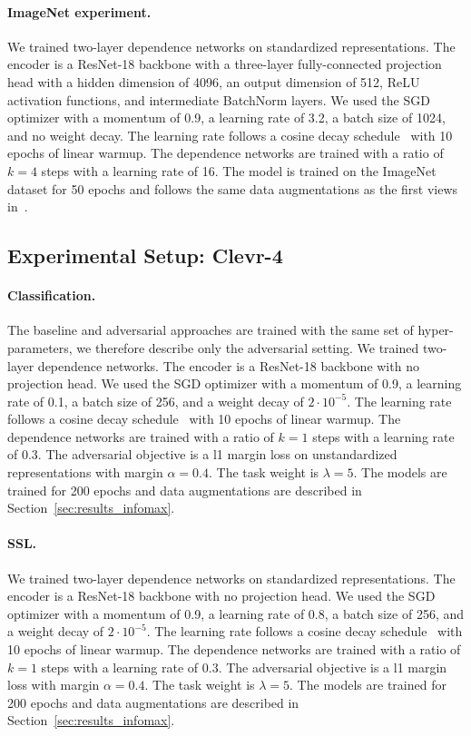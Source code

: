 \paragraph{ImageNet experiment.} We trained two-layer dependence networks on standardized representations. The encoder is a ResNet-18 backbone with a three-layer fully-connected projection head with a hidden dimension of 4096, an output dimension of 512, ReLU activation functions, and intermediate BatchNorm layers. 
We used the SGD optimizer with a momentum of 0.9, a learning rate of 3.2, a batch size of 1024, and no weight decay. 
The learning rate follows a cosine decay schedule~\citep{loshchilov2016sgdr} with 10 epochs of linear warmup. The dependence networks are trained with a ratio of $k=4$ steps with a learning rate of 16. 
The model is trained on the ImageNet dataset for 50 epochs and follows the same data augmentations as the first views in~\cite{grill2020BYOL_ssl}.


\subsection{Experimental Setup: Clevr-4} \label{subapp:setup_clevr4}

\paragraph{Classification.} The baseline and adversarial approaches are trained with the same set of hyper-parameters, we therefore describe only the adversarial setting. 
We trained two-layer dependence networks. The encoder is a ResNet-18 backbone with no projection head. 
We used the SGD optimizer with a momentum of 0.9, a learning rate of 0.1, a batch size of 256, and a weight decay of $2 \cdot 10^{-5}$. 
The learning rate follows a cosine decay schedule~\citep{loshchilov2016sgdr} with 10 epochs of linear warmup. The dependence networks are trained with a ratio of $k=1$ steps with a learning rate of 0.3. The adversarial objective is a l1 margin loss on unstandardized representations with margin $\alpha=0.4$. The task weight is $\lambda = 5$. 
The models are trained for 200 epochs and data augmentations are described in Section~\ref{sec:results_infomax}. 

\paragraph{SSL.} We trained two-layer dependence networks on standardized representations. The encoder is a ResNet-18 backbone with no projection head. 
We used the SGD optimizer with a momentum of 0.9, a learning rate of 0.8, a batch size of 256, and a weight decay of $2 \cdot 10^{-5}$. 
The learning rate follows a cosine decay schedule~\citep{loshchilov2016sgdr} with 10 epochs of linear warmup. The dependence networks are trained with a ratio of $k=1$ steps with a learning rate of 0.3. The adversarial objective is a l1 margin loss with margin $\alpha=0.4$. The task weight is $\lambda = 5$. 
The models are trained for 200 epochs and data augmentations are described in Section~\ref{sec:results_infomax}. 



